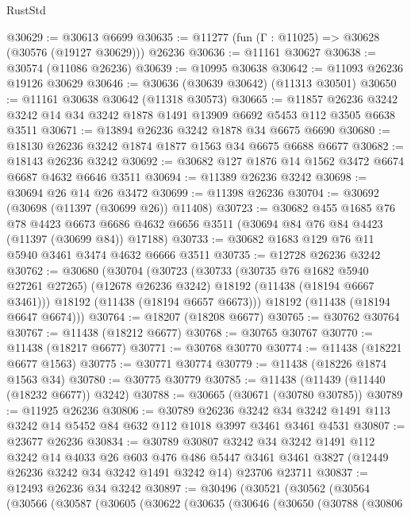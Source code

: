 \begin{lexlean}{RustStd}
\begin{coremodule}
@30629 := @30613 @6699
@30635 := @11277 (fun (Γ : @11025) => @30628 (@30576 (@19127 @30629))) @26236
@30636 := @11161 @30627
@30638 := @30574 (@11086 @26236)
@30639 := @10995 @30638
@30642 := @11093 @26236 @19126 @30629
@30646 := @30636 (@30639 @30642) (@11313 @30501)
@30650 := @11161 @30638 @30642 (@11318 @30573)
@30665 := @11857
    @26236
    @3242
    @3242
    @14
    @34
    @3242
    @1878
    @1491
    @13909
    @6692
    @5453
    @112
    @3505
    @6638
    @3511
@30671 := @13894 @26236 @3242 @1878 @34 @6675 @6690
@30680 := @18130 @26236 @3242 @1874 @1877 @1563 @34 @6675 @6688 @6677
@30682 := @18143 @26236 @3242
@30692 := @30682 @127 @1876 @14 @1562 @3472 @6674 @6687 @4632 @6646 @3511
@30694 := @11389 @26236 @3242
@30698 := @30694 @26 @14 @26 @3472
@30699 := @11398 @26236
@30704 := @30692 (@30698 (@11397 (@30699 @26)) @11408)
@30723 := @30682
    @455
    @1685
    @76
    @78
    @4423
    @6673
    @6686
    @4632
    @6656
    @3511
    (@30694 @84 @76 @84 @4423 (@11397 (@30699 @84)) @17188)
@30733 := @30682 @1683 @129 @76 @11 @5940 @3461 @3474 @4632 @6666 @3511
@30735 := @12728 @26236 @3242
@30762 := @30680
    (@30704
      (@30723
        (@30733
          (@30735 @76 @1682 @5940 @27261 @27265)
          (@12678 @26236 @3242)
          @18192
          (@11438 (@18194 @6667 @3461)))
        @18192
        (@11438 (@18194 @6657 @6673)))
      @18192
      (@11438 (@18194 @6647 @6674)))
@30764 := @18207 (@18208 @6677)
@30765 := @30762 @30764
@30767 := @11438 (@18212 @6677)
@30768 := @30765 @30767
@30770 := @11438 (@18217 @6677)
@30771 := @30768 @30770
@30774 := @11438 (@18221 @6677 @1563)
@30775 := @30771 @30774
@30779 := @11438 (@18226 @1874 @1563 @34)
@30780 := @30775 @30779
@30785 := @11438 (@11439 (@11440 (@18232 @6677)) @3242)
@30788 := @30665 (@30671 (@30780 @30785))
@30789 := @11925 @26236
@30806 := @30789
    @26236
    @3242
    @34
    @3242
    @1491
    @113
    @3242
    @14
    @5452
    @84
    @632
    @112
    @1018
    @3997
    @3461
    @3461
    @4531
@30807 := @23677 @26236
@30834 := @30789
    @30807
    @3242
    @34
    @3242
    @1491
    @112
    @3242
    @14
    @4033
    @26
    @603
    @476
    @486
    @5447
    @3461
    @3461
    @3827
    (@12449 @26236 @3242 @34 @3242 @1491 @3242 @14)
    @23706
    @23711
@30837 := @12493 @26236 @34 @3242
@30897 := @30496
    (@30521
      (@30562
        (@30564
          (@30566
            (@30587
              (@30605
                (@30622
                  (@30635
                    (@30646
                      (@30650
                        (@30788
                          (@30806

\end{coremodule}
\end{lexlean}
